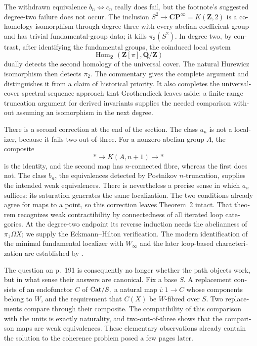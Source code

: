 \begin{otherlanguage}{english}
The withdrawn equivalence $b_n\Leftrightarrow c_n$ really does fail, but the footnote's suggested degree-two failure does not occur. The inclusion $S^2\to\mathbf{CP}^{\infty}=K(\mathbf Z,2)$ is a cohomology isomorphism through degree three with every abelian coefficient group and has trivial fundamental-group data; it kills $\pi_3(S^2)$. In degree two, by contrast, after identifying the fundamental groups, the coinduced local system
\[
 \operatorname{Hom}_{\mathbf Z}(\mathbf Z[\pi],\mathbf Q/\mathbf Z)
\]
dually detects the second homology of the universal cover. The natural Hurewicz isomorphism then detects $\pi_2$. The commentary gives the complete argument and distinguishes it from a claim of historical priority. It also completes the universal-cover spectral-sequence approach that Grothendieck leaves aside: a finite-range truncation argument for derived invariants supplies the needed comparison without assuming an isomorphism in the next degree.

There is a second correction at the end of the section. The class $a_n$ is not a localizer, because it fails two-out-of-three. For a nonzero abelian group $A$, the composite
\[
 *\longrightarrow K(A,n+1)\longrightarrow *
\]
is the identity, and the second map has $n$-connected fibre, whereas the first does not. The class $b_n$, the equivalences detected by Postnikov $n$-truncation, supplies the intended weak equivalences. There is nevertheless a precise sense in which $a_n$ suffices: its saturation generates the same localization. The two conditions already agree for maps to a point, so this correction leaves Theorem~2 intact. That theorem recognizes weak contractibility by connectedness of all iterated loop categories. At the degree-two endpoint its reverse induction needs the abelianness of $\pi_1\Omega X$; we supply the Eckmann--Hilton verification. The modern identification of the minimal fundamental localizer with $W_\infty$ and the later loop-based characterization are established by \citet[Theorems~2.2.11 and 2.3.6]{Cisinski2004Minimal}.

The question on p.~191 is consequently no longer whether the path objects work, but in what sense their answers are canonical. Fix a base $S$. A replacement consists of an endofunctor $C$ of $\mathrm{Cat}/S$, a natural map $i:1\to C$ whose components belong to $W$, and the requirement that $C(X)$ be $W$-fibred over $S$. Two replacements compare through their composite. The compatibility of this comparison with the units is exactly naturality, and two-out-of-three shows that the comparison maps are weak equivalences. These elementary observations already contain the solution to the coherence problem posed a few pages later.


\end{otherlanguage}
